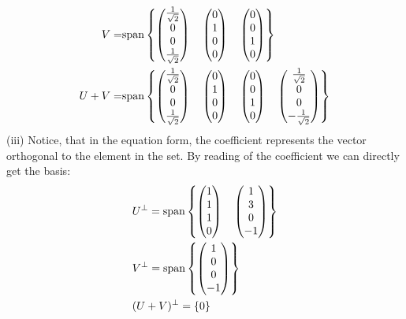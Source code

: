 \documentclass[12pt]{article}
\begin{document}
\begin{align*}
V= &{\rm span}\left\{
\begin{pmatrix}
\frac{1}{\sqrt{2}} \\
0\\
0\\
\frac{1}{\sqrt{2}}
\end{pmatrix}
\quad
\begin{pmatrix}
0 \\
1 \\
0 \\
0
\end{pmatrix}
\quad
\begin{pmatrix}
0 \\
0 \\
1 \\
0
\end{pmatrix}
\right\}\\
U+V= &{\rm span}\left\{
\begin{pmatrix}
\frac{1}{\sqrt{2}} \\
0\\
0\\
\frac{1}{\sqrt{2}}
\end{pmatrix}
\quad
\begin{pmatrix}
0 \\
1 \\
0 \\
0
\end{pmatrix}
\quad
\begin{pmatrix}
0 \\
0 \\
1 \\
0
\end{pmatrix}
\quad
\begin{pmatrix}
\frac{1}{\sqrt{2}} \\
0\\
0\\
-\frac{1}{\sqrt{2}}
\end{pmatrix}
\right\}
\end{align*}
(iii) Notice, that in the equation form, the coefficient represents the vector orthogonal to the element in the set. By reading of the coefficient we can directly get the basis:
\begin{align*}
&U^{\perp}= {\rm span}\left\{
\begin{pmatrix}
1 \\
1 \\
1 \\
0 \\
\end{pmatrix}
\quad
\begin{pmatrix}
1 \\
3 \\
0 \\
-1
\end{pmatrix}
\right\}\\
&V^{\perp}= {\rm span}\left\{
\begin{pmatrix}
1 \\
0\\
0\\
-1
\end{pmatrix}
\right\}\\
&(U+V)^{\perp}=\{0\}
\end{align*}
\end{document}
